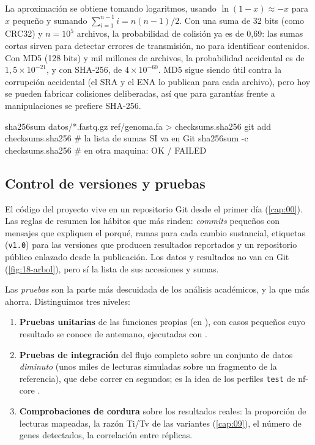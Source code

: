 \begin{simbolos}
\end{simbolos}

La aproximación se obtiene tomando logaritmos, usando $\ln(1-x)\approx -x$ para $x$ pequeño y sumando $\sum_{i=1}^{n-1} i = n(n-1)/2$. Con una suma de 32 bits (como CRC32) y $n=10^5$ archivos, la probabilidad de colisión ya es de 0,69: las sumas cortas sirven para detectar errores de transmisión, no para identificar contenidos. Con MD5 (128 bits) y mil millones de archivos, la probabilidad accidental es de $1{,}5\times10^{-21}$, y con SHA-256, de $4\times10^{-60}$. MD5 sigue siendo útil contra la corrupción accidental (el SRA y el ENA lo publican para cada archivo), pero hoy se pueden fabricar colisiones deliberadas, así que para garantías frente a manipulaciones se prefiere SHA-256.

\begin{consola}
sha256sum datos/*.fastq.gz ref/genoma.fa > checksums.sha256
git add checksums.sha256          # la lista de sumas SI va en Git
sha256sum -c checksums.sha256     # en otra maquina: OK / FAILED
\end{consola}

\subsection{Control de versiones y pruebas}

El código del proyecto vive en un repositorio Git desde el primer día (\cref{cap:00}). Las reglas de \textcite{c18-perezriverol2016} resumen los hábitos que más rinden: \emph{commits} pequeños con mensajes que expliquen el porqué, ramas para cada cambio sustancial, etiquetas (\texttt{v1.0}) para las versiones que producen resultados reportados y un repositorio público enlazado desde la publicación. Los datos y resultados no van en Git (\cref{fig:18-arbol}), pero sí la lista de sus accesiones y sumas.

Las \emph{pruebas} son la parte más descuidada de los análisis académicos, y la que más ahorra. Distinguimos tres niveles:
\begin{enumerate}
  \item \textbf{Pruebas unitarias} de las funciones propias (en ), con casos pequeños cuyo resultado se conoce de antemano, ejecutadas con .
  \item \textbf{Pruebas de integración} del flujo completo sobre un conjunto de datos \emph{diminuto} (unos miles de lecturas simuladas sobre un fragmento de la referencia), que debe correr en segundos; es la idea de los perfiles \texttt{test} de nf-core \parencite{c18-ewels2020}.
  \item \textbf{Comprobaciones de cordura} sobre los resultados reales: la proporción de lecturas mapeadas, la razón Ti/Tv de las variantes (\cref{cap:09}), el número de genes detectados, la correlación entre réplicas.
\end{enumerate}

